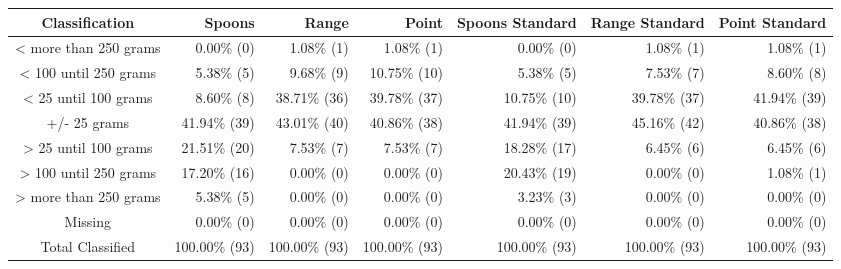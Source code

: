 \begin{table}[t]
\fontsize{12.0pt}{14.4pt}\selectfont
\begin{tabular*}{\linewidth}{@{\extracolsep{\fill}}crrrrrr}
\toprule
Classification & Spoons & Range & Point & Spoons Standard & Range Standard & Point Standard \\ 
\midrule\addlinespace[2.5pt]
< more than 250 grams & 0.00\%  (0) & 1.08\%  (1) & 1.08\%  (1) & 0.00\%  (0) & 1.08\%  (1) & 1.08\%  (1) \\ 
< 100 until 250 grams & 5.38\%  (5) & 9.68\%  (9) & 10.75\% (10) & 5.38\%  (5) & 7.53\%  (7) & 8.60\%  (8) \\ 
< 25 until 100 grams & 8.60\%  (8) & 38.71\% (36) & 39.78\% (37) & 10.75\% (10) & 39.78\% (37) & 41.94\% (39) \\ 
+/- 25 grams & 41.94\% (39) & 43.01\% (40) & 40.86\% (38) & 41.94\% (39) & 45.16\% (42) & 40.86\% (38) \\ 
> 25 until 100 grams & 21.51\% (20) & 7.53\%  (7) & 7.53\%  (7) & 18.28\% (17) & 6.45\%  (6) & 6.45\%  (6) \\ 
> 100 until 250 grams & 17.20\% (16) & 0.00\%  (0) & 0.00\%  (0) & 20.43\% (19) & 0.00\%  (0) & 1.08\%  (1) \\ 
> more than 250 grams & 5.38\%  (5) & 0.00\%  (0) & 0.00\%  (0) & 3.23\%  (3) & 0.00\%  (0) & 0.00\%  (0) \\ 
Missing & 0.00\%  (0) & 0.00\%  (0) & 0.00\%  (0) & 0.00\%  (0) & 0.00\%  (0) & 0.00\%  (0) \\ 
Total Classified & 100.00\% (93) & 100.00\% (93) & 100.00\% (93) & 100.00\% (93) & 100.00\% (93) & 100.00\% (93) \\ 
\bottomrule
\end{tabular*}
\end{table}

